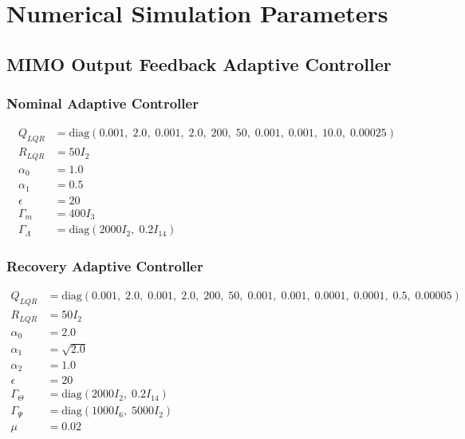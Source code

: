 \chapter{Numerical Simulation Parameters} \label{app:params}

\section{MIMO Output Feedback Adaptive Controller}
\subsection{Nominal Adaptive Controller}
\begin{align*} 
	Q_{LQR} &= \text{diag}(0.001, \; 2.0, \; 0.001, \; 2.0, \; 200, \; 50, \; 0.001, \; 0.001, \; 10.0, \; 0.00025) \\
	R_{LQR} &= 50 I_2 \\
	\alpha_0 &= 1.0 \\
	\alpha_1 &= 0.5 \\
	\epsilon &= 20 \\
	\Gamma_m &= 400 I_3 \\
	\Gamma_\Lambda &= \text{diag}(2000 I_2, \;0.2 I_{14})
\end{align*}

\subsection{Recovery Adaptive Controller}
\begin{align*}
	Q_{LQR} &= \text{diag}(0.001, \; 2.0, \; 0.001, \; 2.0, \; 200, \; 50, \; 0.001, \; 0.001, \; 0.0001, \; 0.0001, \; 0.5, \; 0.00005) \\
	R_{LQR} &= 50 I_2 \\
	\alpha_0 &= 2.0 \\
	\alpha_1 &= \sqrt{2.0} \\
	\alpha_2 &= 1.0 \\
	\epsilon &= 20 \\
	\Gamma_\Theta &= \text{diag}(2000 I_2, \;0.2 I_{14}) \\
	\Gamma_\Psi &= \text{diag}(1000 I_6, \; 5000 I_2) \\
	\mu &= 0.02
\end{align*}


\clearpage
\newpage
